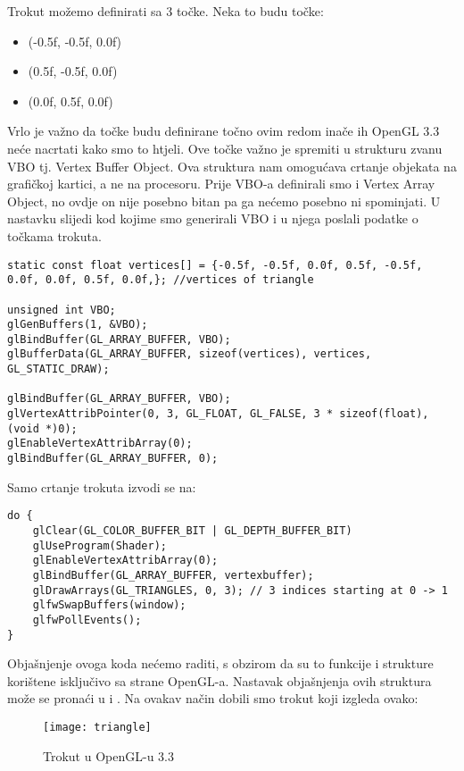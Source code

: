 Trokut možemo definirati sa 3 točke. Neka to budu točke:
\begin{itemize}
	\item (-0.5f, -0.5f, 0.0f)
	\item (0.5f, -0.5f, 0.0f)
	\item (0.0f, 0.5f, 0.0f)
\end{itemize}
Vrlo je važno da točke budu definirane točno ovim redom inače ih OpenGL 3.3 neće nacrtati kako smo to htjeli. Ove točke važno je spremiti u strukturu zvanu VBO tj. Vertex Buffer Object. Ova struktura nam omogućava crtanje objekata na grafičkoj kartici, a ne na procesoru\cite{16}. Prije VBO-a definirali smo i Vertex Array Object, no ovdje on nije posebno bitan pa ga nećemo posebno ni spominjati. U nastavku slijedi kod kojime smo generirali VBO i u njega poslali podatke o točkama trokuta\cite{15}.\newpage
\begin{lstlisting}[style = myC++, label = {code:16}, caption = {Generiranje VBO\cite{16}}]
static const float vertices[] = {-0.5f, -0.5f, 0.0f, 0.5f, -0.5f, 0.0f, 0.0f, 0.5f, 0.0f,}; //vertices of triangle
	  
unsigned int VBO;
glGenBuffers(1, &VBO);
glBindBuffer(GL_ARRAY_BUFFER, VBO);
glBufferData(GL_ARRAY_BUFFER, sizeof(vertices), vertices, GL_STATIC_DRAW);
	  
glBindBuffer(GL_ARRAY_BUFFER, VBO);
glVertexAttribPointer(0, 3, GL_FLOAT, GL_FALSE, 3 * sizeof(float), (void *)0);
glEnableVertexAttribArray(0);
glBindBuffer(GL_ARRAY_BUFFER, 0);
\end{lstlisting}
Samo crtanje trokuta izvodi se na:
\begin{lstlisting}[style = myC++, label = {code:16-1}, caption = {Crtanje trokuta\cite{15}}]
do {
	glClear(GL_COLOR_BUFFER_BIT | GL_DEPTH_BUFFER_BIT)
	glUseProgram(Shader);
	glEnableVertexAttribArray(0);
	glBindBuffer(GL_ARRAY_BUFFER, vertexbuffer);
	glDrawArrays(GL_TRIANGLES, 0, 3); // 3 indices starting at 0 -> 1
	glfwSwapBuffers(window);
	glfwPollEvents();
}
\end{lstlisting}

Objašnjenje ovoga koda nećemo raditi, s obzirom da su to funkcije i strukture korištene isključivo sa strane OpenGL-a. Nastavak objašnjenja ovih struktura može se pronaći u \cite{15} i \cite{16}. Na ovakav način dobili smo trokut koji izgleda ovako:\newpage
\begin{figure}[!http]
	\begin{center}
		\texttt{[image: triangle]}
		\caption{Trokut u OpenGL-u 3.3}
		\label{fig:29}
		\end{center}
\end{figure}

